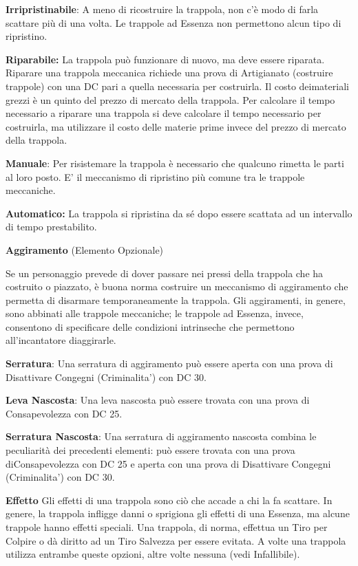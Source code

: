 \documentclass[a4paper,11pt,twoside,openany]{book}
\begin{document}
\textbf{Irripristinabile}: A meno di ricostruire la trappola, non c'è modo di farla scattare più di una volta. Le trappole ad Essenza non permettono alcun tipo di ripristino.

\textbf{Riparabile:} La trappola può funzionare di nuovo, ma deve essere riparata. Riparare una trappola meccanica richiede una prova di Artigianato (costruire trappole) con una DC pari a quella necessaria per costruirla. Il costo deimateriali grezzi è un quinto del prezzo di mercato della trappola. Per calcolare il tempo necessario a riparare una trappola si deve calcolare il tempo necessario per costruirla, ma utilizzare il costo delle materie prime invece del prezzo di mercato della trappola.

\textbf{Manuale}: Per risistemare la trappola è necessario che qualcuno rimetta le parti al loro posto. E' il meccanismo di ripristino più comune tra le trappole meccaniche.

\textbf{Automatico:} La trappola si ripristina da sé dopo essere scattata ad un intervallo di tempo prestabilito.

\textbf{Aggiramento} (Elemento Opzionale)

Se un personaggio prevede di dover passare nei pressi della trappola che ha costruito o piazzato, è buona norma costruire un meccanismo di aggiramento che permetta di disarmare temporaneamente la trappola. Gli aggiramenti, in genere, sono abbinati alle trappole meccaniche; le trappole ad Essenza, invece, consentono di specificare delle condizioni intrinseche che permettono all'incantatore diaggirarle.

\textbf{Serratura}: Una serratura di aggiramento può essere aperta con una prova di Disattivare Congegni (Criminalita') con DC 30.

\textbf{Leva Nascosta}: Una leva nascosta può essere trovata con una prova di Consapevolezza con DC 25.

\textbf{Serratura Nascosta}: Una serratura di aggiramento nascosta combina le peculiarità dei precedenti elementi: può essere trovata con una prova diConsapevolezza con DC 25 e aperta con una prova di Disattivare Congegni (Criminalita') con DC 30.

\textbf{Effetto}
Gli effetti di una trappola sono ciò che accade a chi la fa scattare. In genere, la trappola infligge danni o sprigiona gli effetti di una Essenza, ma alcune trappole hanno effetti speciali. Una trappola, di norma, effettua un Tiro per Colpire o dà diritto ad un Tiro Salvezza per essere evitata. A volte una trappola utilizza entrambe queste opzioni, altre volte nessuna (vedi Infallibile).
\end{document}
